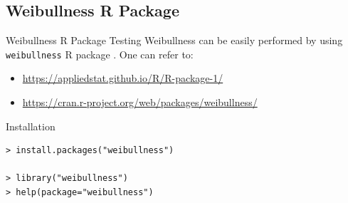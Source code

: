 \subsection{Weibullness R Package}
\begin{frame}[fragile]{Weibullness R Package}
Testing Weibullness can be easily performed by using \texttt{weibullness} R package
\cite{Park:2018b}. 
One can refer to:
\begin{itemize}
\item \url{https://appliedstat.github.io/R/R-package-1/}  \\
     \href{https://appliedstat.github.io/R/R-package-1/}{}
\item \url{https://cran.r-project.org/web/packages/weibullness/}  \\
     \href{https://cran.r-project.org/web/packages/weibullness/}{}
\end{itemize}
\begin{exampleblock}{Installation}
\begin{verbatim}
> install.packages("weibullness")

> library("weibullness")
> help(package="weibullness")
\end{verbatim}
\end{exampleblock}
\end{frame}

